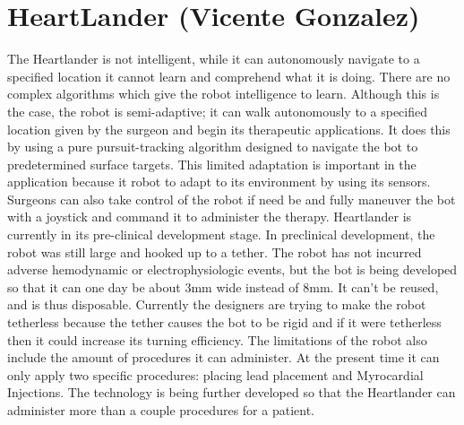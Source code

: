 \documentclass[12pt,conference]{IEEEtran}
\begin{document}
\section {HeartLander (Vicente Gonzalez)}

\indent The Heartlander is not intelligent, while it can autonomously navigate to a specified location it cannot learn and comprehend what it is doing. There are no complex algorithms which give the robot intelligence to learn. Although this is the case, the robot is semi-adaptive; it can walk autonomously to a specified location given by the surgeon and begin its therapeutic applications. It does this by using a pure pursuit-tracking algorithm designed to navigate the bot to predetermined surface targets. This limited adaptation is important in the application because it robot to adapt to its environment by using its sensors. Surgeons can also take control of the robot if need be and fully maneuver the bot with a joystick and command it to administer the therapy. Heartlander is currently in its pre-clinical development stage.
\newline
\indent In preclinical development, the robot was still large and hooked up to a tether. The robot has not incurred adverse hemodynamic or electrophysiologic events, but the bot is being developed so that it can one day be about 3mm wide instead of 8mm. It can’t be reused, and is thus disposable. Currently the designers are trying to make the robot tetherless because the tether causes the bot to be rigid and if it were tetherless then it could increase its turning efficiency. The limitations of the robot also include the amount of procedures it can administer. At the present time it can only apply two specific procedures: placing lead placement and Myrocardial Injections. The technology is being further developed so that the Heartlander can administer more than a couple procedures for a patient. 
\end{document}
